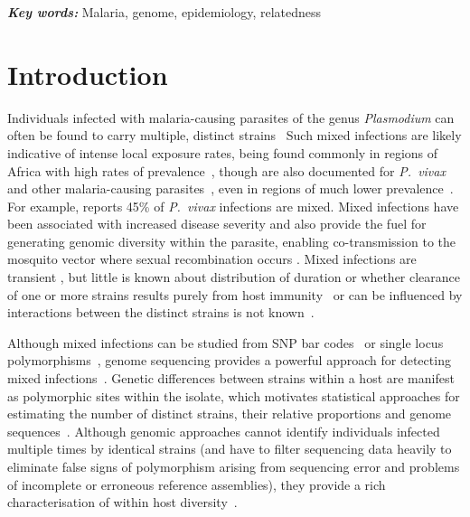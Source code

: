 \documentclass[9pt,lineno]{elife}
\providecommand{\keywords}[1]{\textbf{\textit{Key words:}} #1}
\begin{document}
\keywords{Malaria, genome, epidemiology, relatedness}


\section{Introduction}


Individuals infected with malaria-causing parasites of the genus {\it Plasmodium} can often be found to carry multiple, distinct strains~\citep{Bell2006}  Such mixed infections are likely indicative of intense local exposure rates, being found commonly in regions of Africa with high rates of prevalence~\citep{Bhatt2015, Howes2016}, though are also documented for {\it P.~vivax} and other malaria-causing parasites~\citep{Mueller2007, Collins2012}, even in regions of much lower prevalence~\citep{Howes2016, Steenkeste2010}.  For example, \citet{Pearson2016} reports 45\% of {\it P.~vivax} infections are mixed.  Mixed infections have been associated with increased disease severity \citep{deRoode2005} and also provide the fuel for generating genomic diversity within the parasite, enabling co-transmission to the mosquito vector where sexual recombination occurs \citep{Mzilahowa2007}.  Mixed infections are transient \citep{Bruce2002, Zimmerman2004}, but little is known about distribution of duration or whether clearance of one or more strains results purely from host immunity~\citep{Borrmann2011} or can be influenced by interactions between the distinct strains is not known~\citep{Enosse2006, Bushman2016}.

Although mixed infections can be studied from SNP bar codes~\citep{Galinsky2015} or single locus polymorphisms~\citep{Jack2016}, genome sequencing provides a powerful approach for detecting mixed infections~\citep{Chang2017}.  Genetic differences between strains within a host are manifest as polymorphic sites within the isolate, which motivates statistical approaches for estimating the number of distinct strains, their relative proportions and genome sequences~\citep{Zhu2017}.  Although genomic approaches cannot identify individuals infected multiple times by identical strains (and have to filter sequencing data heavily to eliminate false signs of polymorphism arising from sequencing error and problems of incomplete or erroneous reference assemblies), they provide a rich characterisation of within host diversity~\citep{Manske2012}.
\end{document}
